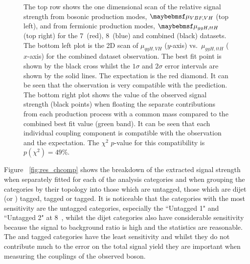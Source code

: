 \begin{figure}
  \caption[Best fit values and \NLL scans of the signal strength from fermionic and bosonic production modes]{The top row shows the one dimensional \NLL scan of the \SM relative signal strength from bosonic production modes, $\RV$ (top left), and from fermionic production modes, $\RF$ (top right) for the 7~\TeV (red), 8~\TeV (blue) and combined (black) datasets. The bottom left plot is the 2D \NLL scan of $\mu_{qqH,VH}$ ($y$-axis) vs.~$\mu_{ggH,ttH}$ ($x$-axis) for the combined dataset observation. The best fit point is shown by the black cross whilst the $1\sigma$ and $2\sigma$ error intervals are shown by the solid lines. The \SM expectation is the red diamond. It can be seen that the observation is very compatible with the \SM prediction. The bottom right plot shows the value of the observed signal strength (black points) when floating the separate contributions from each production process with a common mass compared to the combined best fit value (green band). It can be seen that each individual coupling component is compatible with the observation and the \SM expectation. The $\chi^{2}$ $p$-value for this compatibility is $p(\chi^{2})=49\%$.}
  \label{fig:res_rvrf}
\end{figure}

Figure ~\ref{fig:res_chcomp} shows the breakdown of the extracted signal strength when separately fitted for each of the analysis categories and when grouping the categories by their topology into those which are untagged, those which are dijet (or \VBF) tagged, \VH tagged or \ttH tagged. It is noticeable that the categories with the most sensitivity are the untagged categories, especially the ``Untagged 1" and ``Untagged 2" at 8~\TeV, whilst the dijet categories also have considerable sensitivity because the signal to background ratio is high and the statistics are reasonable. The \VH and \ttH tagged categories have the least sensitivity and whilst they do not contribute much to the error on the total signal yield they are important when measuring the couplings of the observed boson.

